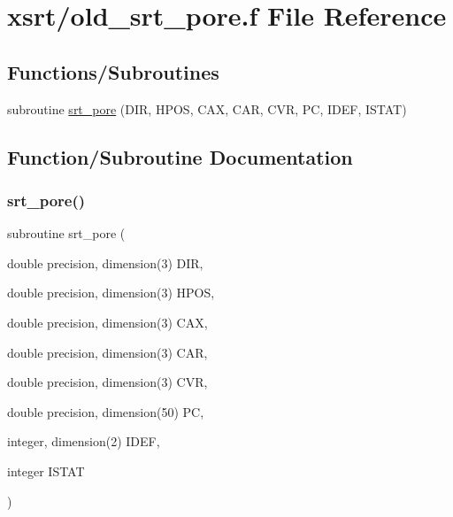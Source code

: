\hypertarget{old__srt__pore_8f}{}\section{xsrt/old\+\_\+srt\+\_\+pore.f File Reference}
\label{old__srt__pore_8f}
\subsection*{Functions/\+Subroutines}
\begin{DoxyCompactItemize}
\item 
subroutine \hyperlink{old__srt__pore_8f_ae37bf82014c11925841351afdce50670}{srt\+\_\+pore} (D\+IR, H\+P\+OS, C\+AX, C\+AR, C\+VR, PC, I\+D\+EF, I\+S\+T\+AT)
\end{DoxyCompactItemize}


\subsection{Function/\+Subroutine Documentation}
\mbox{\label{old__srt__pore_8f_ae37bf82014c11925841351afdce50670}} 
\subsubsection{\texorpdfstring{srt\+\_\+pore()}{srt\_pore()}}
{\footnotesize\ttfamily subroutine srt\+\_\+pore (\begin{DoxyParamCaption}\item[{double precision, dimension(3)}]{D\+IR,  }\item[{double precision, dimension(3)}]{H\+P\+OS,  }\item[{double precision, dimension(3)}]{C\+AX,  }\item[{double precision, dimension(3)}]{C\+AR,  }\item[{double precision, dimension(3)}]{C\+VR,  }\item[{double precision, dimension(50)}]{PC,  }\item[{integer, dimension(2)}]{I\+D\+EF,  }\item[{integer}]{I\+S\+T\+AT }\end{DoxyParamCaption})}


